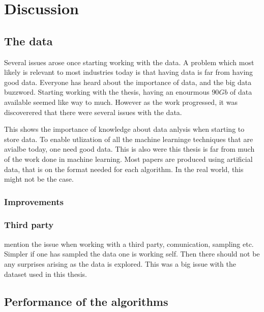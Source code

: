 \chapter{Discussion}\label{cha:discussion}


\section{The data}
    Several issues arose once starting working with the data. A problem which most likely is relevant to most industries today is that having data is far from having good data. Everyone has heard about the importance of data, and the big data buzzword. Starting working with the thesis, having an enourmous $90Gb$ of data available seemed like way to much. However as the work progressed, it was discoverered that there were several issues with the data. 
    
    This shows the importance of knowledge about data anlysis when starting to store data. To enable utlization of all the machine learninge techniques that are avialbe today, one need good data. This is also were this thesis is far from much of the work done in machine learning. Most papers are produced using artificial data, that is on the format needed for each algorithm. In the real world, this might not be the case. 
    
    \subsection{Improvements}
    
    \subsection{Third party}
        mention the issue when working with a third party, comunication, sampling etc. Simpler if one has sampled the data one is working self. Then there should not be any surprises arising as the data is explored. This was a big issue with the dataset used in this thesis. 
\section{Performance of the algorithms}


